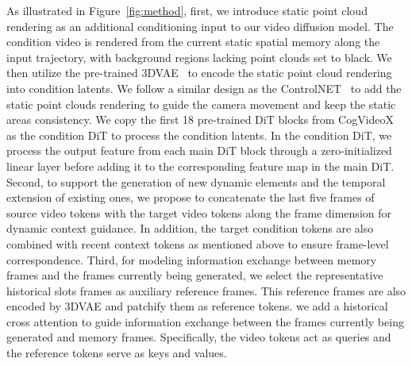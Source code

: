 As illustrated in Figure~\ref{fig:method}, first, we introduce static point cloud rendering as an additional conditioning input to our video diffusion model. The condition video is rendered from the current static spatial memory along the input trajectory, with background regions lacking point clouds set to black. We then utilize the pre-trained 3DVAE~\cite{yang2024cogvideox} to encode the static point cloud rendering into condition latents. We follow a similar design as the ControlNET~\cite{zhang2023controlnet} to add the static point clouds rendering to guide the camera movement and keep the static areas consistency. We copy the first 18 pre-trained DiT blocks from CogVideoX as the condition DiT to process the condition latents. In the condition DiT, we process the output feature from each main DiT block through a zero-initialized linear layer before adding it to the corresponding feature map in the main DiT.
Second, to support the generation of new dynamic elements and the temporal extension of existing ones, we propose to concatenate the last five frames of source video tokens with the target video tokens along the frame dimension for dynamic context guidance. In addition, the target condition tokens are also combined with recent context tokens as mentioned above to ensure frame-level correspondence. 
Third, for modeling information exchange between memory frames and the frames currently being generated, we select the representative historical slots frames as auxiliary reference frames. This reference frames are also encoded by 3DVAE and patchify them as reference tokens. we add a historical cross attention to guide information exchange between the frames currently being generated and memory frames. Specifically, the video tokens act as queries and the reference tokens serve as keys and values.

% 







